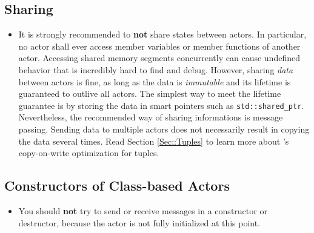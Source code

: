 \subsection{Sharing}

\begin{itemize}
\item It is strongly recommended to \textbf{not} share states between actors.
In particular, no actor shall ever access member variables or member functions of another actor.
Accessing shared memory segments concurrently can cause undefined behavior that is incredibly hard to find and debug.
However, sharing \textit{data} between actors is fine, as long as the data is \textit{immutable} and its lifetime is guaranteed to outlive all actors.
The simplest way to meet the lifetime guarantee is by storing the data in smart pointers such as \lstinline^std::shared_ptr^.
Nevertheless, the recommended way of sharing informations is message passing.
Sending data to multiple actors does not necessarily result in copying the data several times.
Read Section \ref{Sec::Tuples} to learn more about \lib's copy-on-write optimization for tuples.
\end{itemize}

\subsection{Constructors of Class-based Actors}

\begin{itemize}
\item You should \textbf{not} try to send or receive messages in a constructor or destructor, because the actor is not fully initialized at this point.
\end{itemize}
